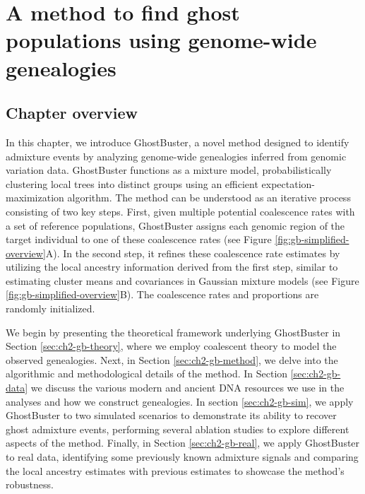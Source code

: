 \chapter{\label{ch:2-gb-method}A method to find ghost populations using genome-wide genealogies}

\minitoc

\section{Chapter overview}
In this chapter, we introduce GhostBuster, a novel method designed to identify admixture events by analyzing genome-wide genealogies inferred from genomic variation data. GhostBuster functions as a mixture model, probabilistically clustering local trees into distinct groups using an efficient expectation-maximization algorithm. The method can be understood as an iterative process consisting of two key steps. First, given multiple potential coalescence rates with a set of reference populations, GhostBuster assigns each genomic region of the target individual to one of these coalescence rates (see Figure \ref{fig:gb-simplified-overview}A). In the second step, it refines these coalescence rate estimates by utilizing the local ancestry information derived from the first step, similar to estimating cluster means and covariances in Gaussian mixture models (see Figure \ref{fig:gb-simplified-overview}B). The coalescence rates and proportions are randomly initialized.

We begin by presenting the theoretical framework underlying GhostBuster in Section \ref{sec:ch2-gb-theory}, where we employ coalescent theory to model the observed genealogies. Next, in Section \ref{sec:ch2-gb-method}, we delve into the algorithmic and methodological details of the method. In Section \ref{sec:ch2-gb-data} we discuss the various modern and ancient DNA resources we use in the analyses and how we construct genealogies. In section \ref{sec:ch2-gb-sim}, we apply GhostBuster to two simulated scenarios to demonstrate its ability to recover ghost admixture events, performing several ablation studies to explore different aspects of the method. Finally, in Section \ref{sec:ch2-gb-real}, we apply GhostBuster to real data, identifying some previously known admixture signals and comparing the local ancestry estimates with previous estimates to showcase the method's robustness.


